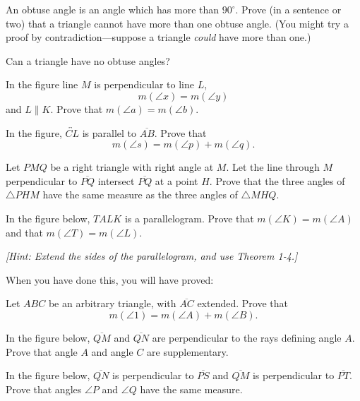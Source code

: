 \documentclass[12pt]{book} %
\begin{document}
\begin{ExerciseList}
	
	\Exercise An obtuse angle is an angle which has more than $90^\circ$. Prove (in a sentence or two) that a triangle cannot have more than one obtuse angle. (You might try a proof by contradiction---suppose a triangle \textit{could} have more than one.)
	
	\Exercise Can a triangle have no obtuse angles?
	
	\Exercise In the figure line $M$ is perpendicular to line $L$,
	\[
	m(\angle x)=m(\angle y)
	\]
	and $L\parallel K$.
	Prove that $m(\angle a)=m(\angle b)$.
	
	
	\Exercise In the figure, $\overleftrightarrow{CL}$ is parallel to $\overline{AB}$. Prove that
	\[
	m(\angle s)=m(\angle p)+m(\angle q).
	\]
	
	
	\Exercise Let $PMQ$ be a right triangle with right angle at $M$. Let the line through $M$ perpendicular to $\overline{PQ}$ intersect $\overline{PQ}$ at a point $H$. Prove that the three angles of $\triangle PHM$ have the same measure as the three angles of $\triangle MHQ$.
	
	
	\Exercise In the figure below, $TALK$ is a parallelogram. Prove that $m(\angle K)=m(\angle A)$ and that $m(\angle T)=m(\angle L)$.
	
	
	\textit{[Hint: Extend the sides of the parallelogram, and use Theorem 1-4.]}
	
	\Exercise When you have done this, you will have proved:
	
	
	\Exercise Let $ABC$ be an arbitrary triangle, with $\overline{AC}$ extended. Prove that
	\[
	m(\angle 1)=m(\angle A)+m(\angle B).
	\]
	
	
	\Exercise In the figure below, $\overline{QM}$ and $\overline{QN}$ are perpendicular to the rays defining angle $A$. Prove that angle $A$ and angle $C$ are supplementary.
	
	
	\Exercise In the figure below, $\overline{QN}$ is perpendicular to $\overline{PS}$ and $\overline{QM}$ is perpendicular to $\overline{PT}$. Prove that angles $\angle P$ and $\angle Q$ have the same measure.
	

\end{ExerciseList}
\end{document}
